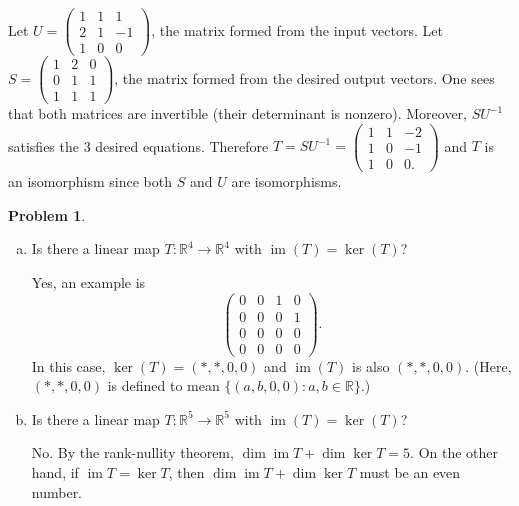 \documentclass[11pt,oneside]{amsart}
\theoremstyle{definition}
\newtheorem{problem}{Problem}
\newcommand{\bR}{\mathbb{R}}
\DeclareMathOperator{\im}{im}
\begin{document}
    \begin{solution}
        Let $U=\begin{pmatrix}
            1&1&1\\2&1&-1\\1&0&0
        \end{pmatrix}$, the matrix formed from the input vectors. Let $S=\begin{pmatrix}
            1&2&0\\0&1&1\\1&1&1
        \end{pmatrix}$, the matrix formed from the desired output vectors. One sees that both matrices are invertible (their determinant is nonzero). Moreover, $SU^{-1}$ satisfies the 3 desired equations. Therefore $T=SU^{-1}=\begin{pmatrix}
            1&1&-2\\1&0&-1\\1&0&0.
        \end{pmatrix}$ and $T$ is an isomorphism since both $S$ and $U$ are isomorphisms.
    \end{solution}
    
    \begin{problem}
        \leavevmode\begin{enumerate}[(a)]
            \item Is there a linear map $T\colon\bR^4\to\bR^4$ with $\im(T)=\ker(T)$?
            \begin{solution}
                Yes, an example is
                \[\begin{pmatrix}
                    0&0&1&0\\
                    0&0&0&1\\
                    0&0&0&0\\
                    0&0&0&0
                \end{pmatrix}.\]
                In this case, $\ker(T)=(*,*,0,0)$ and $\im(T)$ is also $(*,*,0,0)$. (Here, $(*,*,0,0)$ is defined to mean $\{(a,b,0,0):a,b\in\bR\}$.)
            \end{solution}
            \item Is there a linear map $T\colon\bR^5\to\bR^5$ with $\im(T)=\ker(T)$?
            \begin{solution}
                No. By the rank-nullity theorem, $\dim \im T+\dim\ker T=5$. On the other hand, if $\im T=\ker T$, then $\dim \im T+\dim\ker T$ must be an even number.
            \end{solution}
        \end{enumerate}
    \end{problem}
    
\end{document}
